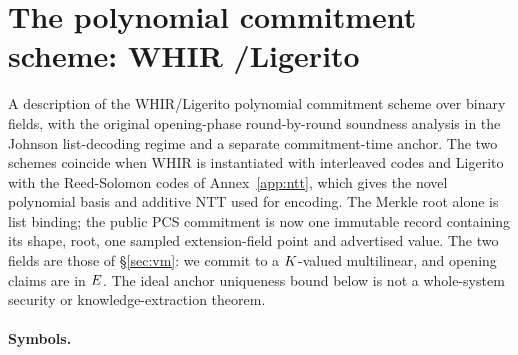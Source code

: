 \section{The polynomial commitment scheme: WHIR \slash Ligerito}\label{annex:pcs}

A description of the WHIR\slash Ligerito polynomial commitment scheme \cite{ACFY25,NA25} over binary fields, with the original opening-phase round-by-round soundness analysis in the Johnson list-decoding regime and a separate commitment-time anchor. The two schemes coincide when WHIR is instantiated with interleaved codes and Ligerito with the Reed-Solomon codes of Annex~\ref{app:ntt}, which gives the novel polynomial basis and additive NTT used for encoding. The Merkle root alone is list binding; the public PCS commitment is now one immutable record containing its shape, root, one sampled extension-field point and advertised value. The two fields are those of \S\ref{sec:vm}: we commit to a $K$-valued multilinear, and opening claims are in $E$. The ideal anchor uniqueness bound below is not a whole-system security or knowledge-extraction theorem.

\paragraph{Symbols.}

